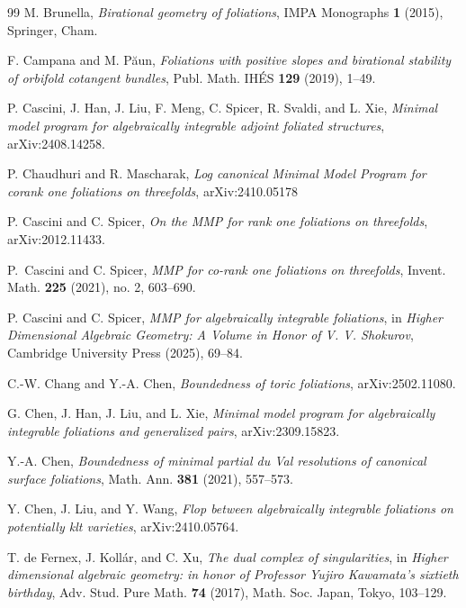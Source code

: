 \documentclass[12pt]{amsart}
\numberwithin{equation}{section}
\theoremstyle{definition}
\theoremstyle{definition}
\theoremstyle{definition}
\begin{document}
\begin{thebibliography}{99}
 M. Brunella, \textit{Birational geometry of foliations}, IMPA Monographs \textbf{1} (2015), Springer, Cham.

 F. Campana and M. P\u{a}un, \textit{Foliations with positive slopes and birational stability of orbifold cotangent bundles}, Publ. Math. IHÉS \textbf{129} (2019), 1--49.

 P. Cascini, J. Han, J. Liu, F. Meng, C. Spicer, R. Svaldi, and L. Xie, \textit{Minimal model program for algebraically integrable adjoint foliated structures}, arXiv:2408.14258.

P. Chaudhuri and R. Mascharak, 
\textit{Log canonical Minimal Model Program for corank one foliations on threefolds}, arXiv:2410.05178 

 P. Cascini and C. Spicer, \textit{On the MMP for rank one foliations on threefolds}, arXiv:2012.11433.

 P.~Cascini and C. Spicer, \textit{MMP for co-rank one foliations on threefolds}, Invent. Math. \textbf{225} (2021), no. 2, 603--690.


 P. Cascini and C. Spicer, \textit{MMP for algebraically integrable foliations}, in \textit{Higher Dimensional Algebraic Geometry: A Volume in Honor of V. V. Shokurov}, Cambridge University Press (2025), 69--84.

 C.-W. Chang and Y.-A. Chen, \textit{Boundedness of toric foliations}, arXiv:2502.11080.


 G. Chen, J. Han, J. Liu, and L. Xie, \textit{Minimal model program for algebraically integrable foliations and generalized pairs}, arXiv:2309.15823. 

 Y.-A. Chen, \textit{Boundedness of minimal partial du Val resolutions of canonical surface foliations}, Math. Ann. \textbf{381} (2021), 557--573.

 Y. Chen, J. Liu, and Y. Wang, \textit{Flop between algebraically integrable foliations on potentially klt varieties}, arXiv:2410.05764.



 T. de Fernex, J. Koll\'ar, and C. Xu, \textit{The dual complex of singularities}, in \textit{Higher dimensional algebraic geometry: in honor of Professor Yujiro Kawamata’s sixtieth birthday}, Adv. Stud. Pure Math. \textbf{74} (2017), Math. Soc. Japan, Tokyo, 103--129. 


\end{thebibliography}
\end{document}
